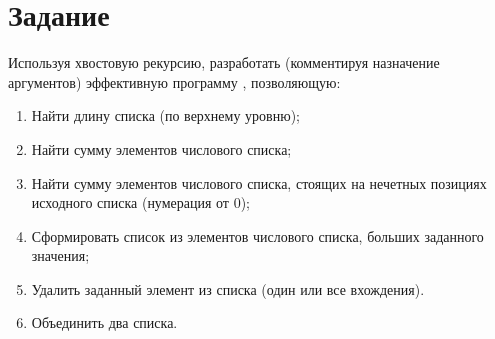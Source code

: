 \section*{Задание}

Используя хвостовую рекурсию, разработать (комментируя назначение аргументов)
эффективную программу , позволяющую:
\begin{enumerate}
    \item Найти длину списка (по верхнему уровню);
    \item Найти сумму элементов числового списка;
    \item Найти сумму элементов числового списка, стоящих на нечетных позициях
          исходного списка (нумерация от 0);
    \item Сформировать список из элементов числового списка, больших заданного
          значения;
    \item Удалить заданный элемент из списка (один или все вхождения).
    \item Объединить два списка.
\end{enumerate}

